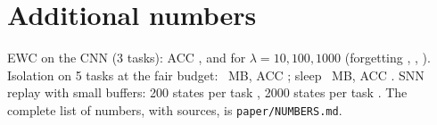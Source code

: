 \documentclass[10pt]{article}
\begin{document}
\section{Additional numbers}
\label{app:numbers}
EWC on the CNN (3 tasks): ACC \ewcAccTen, \ewcAccHundred and \ewcAccThousand for $\lambda=10,100,1000$ (forgetting
\ewcForgetTen, \ewcForgetHundred, \ewcForgetThousand). Isolation on 5 tasks at the fair budget: \memSnnFiveFairIsoMb~MB,
ACC \memSnnFiveFairIsoAcc; sleep \memSnnFiveFairSleepMb~MB, ACC \memSnnFiveFairSleepAcc. SNN replay with small buffers:
200 states per task \smallSnnReplayTwoHundredAcc, 2000 states per task \smallSnnReplayTwoThousandAcc. The complete list
of numbers, with sources, is \texttt{paper/NUMBERS.md}.
\end{document}
